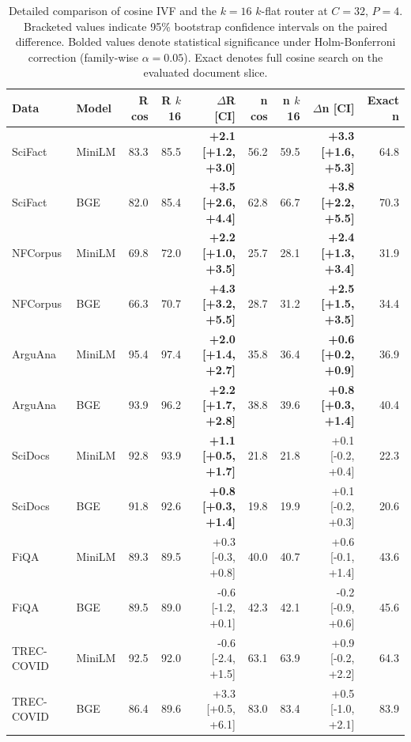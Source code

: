\begin{table}[t]
\centering
\caption{Detailed comparison of cosine IVF and the $k{=}16$ $k$-flat router at $C{=}32$, $P{=}4$. Bracketed values indicate 95\% bootstrap confidence intervals on the paired difference. Bolded values denote statistical significance under Holm-Bonferroni correction (family-wise $\alpha = 0.05$). Exact denotes full cosine search on the evaluated document slice.}
\label{tab:perpair}
\footnotesize
\setlength{\tabcolsep}{3.2pt}
\begin{tabular}{llrrrrrrr}
\toprule
Data & Model & R cos & R $k$16 & $\Delta$R [CI] & n cos & n $k$16 & $\Delta$n [CI] & Exact n \\
\midrule
SciFact & MiniLM & 83.3 & 85.5 & \textbf{+2.1 [+1.2, +3.0]} & 56.2 & 59.5 & \textbf{+3.3 [+1.6, +5.3]} & 64.8 \\
SciFact & BGE & 82.0 & 85.4 & \textbf{+3.5 [+2.6, +4.4]} & 62.8 & 66.7 & \textbf{+3.8 [+2.2, +5.5]} & 70.3 \\
NFCorpus & MiniLM & 69.8 & 72.0 & \textbf{+2.2 [+1.0, +3.5]} & 25.7 & 28.1 & \textbf{+2.4 [+1.3, +3.4]} & 31.9 \\
NFCorpus & BGE & 66.3 & 70.7 & \textbf{+4.3 [+3.2, +5.5]} & 28.7 & 31.2 & \textbf{+2.5 [+1.5, +3.5]} & 34.4 \\
ArguAna & MiniLM & 95.4 & 97.4 & \textbf{+2.0 [+1.4, +2.7]} & 35.8 & 36.4 & \textbf{+0.6 [+0.2, +0.9]} & 36.9 \\
ArguAna & BGE & 93.9 & 96.2 & \textbf{+2.2 [+1.7, +2.8]} & 38.8 & 39.6 & \textbf{+0.8 [+0.3, +1.4]} & 40.4 \\
SciDocs & MiniLM & 92.8 & 93.9 & \textbf{+1.1 [+0.5, +1.7]} & 21.8 & 21.8 & +0.1 [-0.2, +0.4] & 22.3 \\
SciDocs & BGE & 91.8 & 92.6 & \textbf{+0.8 [+0.3, +1.4]} & 19.8 & 19.9 & +0.1 [-0.2, +0.3] & 20.6 \\
FiQA & MiniLM & 89.3 & 89.5 & +0.3 [-0.3, +0.8] & 40.0 & 40.7 & +0.6 [-0.1, +1.4] & 43.6 \\
FiQA & BGE & 89.5 & 89.0 & -0.6 [-1.2, +0.1] & 42.3 & 42.1 & -0.2 [-0.9, +0.6] & 45.6 \\
TREC-COVID & MiniLM & 92.5 & 92.0 & -0.6 [-2.4, +1.5] & 63.1 & 63.9 & +0.9 [-0.2, +2.2] & 64.3 \\
TREC-COVID & BGE & 86.4 & 89.6 & +3.3 [+0.5, +6.1] & 83.0 & 83.4 & +0.5 [-1.0, +2.1] & 83.9 \\
\bottomrule
\end{tabular}
\end{table}
